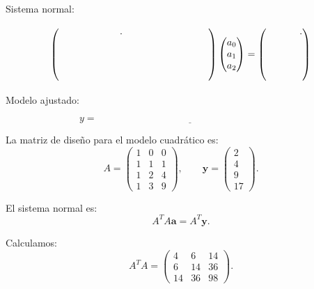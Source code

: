 \documentclass[11pt,respuestas,a4]{aleph-examen}
\begin{document}
\begin{preguntas}
Sistema normal:

\[
\begin{pmatrix}
\hspace{2.2cm} .& \hspace{1.2cm} & \hspace{1.2cm} \\[0.4cm]
\hspace{1.2cm} & \hspace{1.2cm} & \hspace{1.2cm} \\[0.4cm]
\hspace{1.2cm} & \hspace{1.2cm} & \hspace{1.2cm}
\end{pmatrix}
\begin{pmatrix}
a_0\\
a_1\\
a_2
\end{pmatrix}
=
\begin{pmatrix}
\hspace{1.2cm}.\\[0.4cm]
\hspace{1.2cm}\\[0.4cm]
\hspace{1.2cm}
\end{pmatrix}
\]

Modelo ajustado:

\[
y=\underline{\hspace{8cm}}
\]

\begin{respuesta}
La matriz de diseño para el modelo cuadrático es:
\[
A=
\begin{pmatrix}
1 & 0 & 0 \\
1 & 1 & 1 \\
1 & 2 & 4 \\
1 & 3 & 9
\end{pmatrix},
\qquad
\mathbf{y}=
\begin{pmatrix}
2\\
4\\
9\\
17
\end{pmatrix}.
\]

El sistema normal es:
\[
A^TA\mathbf{a}=A^T\mathbf{y}.
\]

Calculamos:
\[
A^TA=
\begin{pmatrix}
4 & 6 & 14 \\
6 & 14 & 36 \\
14 & 36 & 98
\end{pmatrix}.
\]


\end{respuesta}
\end{preguntas}
\end{document}
